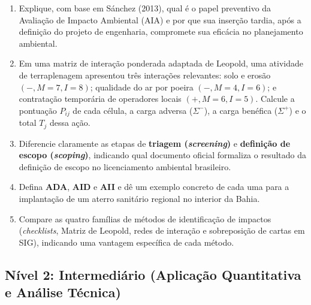 \begin{enumerate}[leftmargin=1.8em, itemsep=4pt]
  \item Explique, com base em Sánchez (2013), qual é o papel preventivo da Avaliação de Impacto Ambiental (AIA) e por que sua inserção tardia, após a definição do projeto de engenharia, compromete sua eficácia no planejamento ambiental.
  \espacoResolucao[2.0cm]

  \item Em uma matriz de interação ponderada adaptada de Leopold, uma atividade de terraplenagem apresentou três interações relevantes: solo e erosão $(-, M=7, I=8)$; qualidade do ar por poeira $(-, M=4, I=6)$; e contratação temporária de operadores locais $(+, M=6, I=5)$. Calcule a pontuação $P_{ij}$ de cada célula, a carga adversa ($\Sigma^{-}$), a carga benéfica ($\Sigma^{+}$) e o total $T_j$ dessa ação.
  \espacoResolucao[2.2cm]

  \item Diferencie claramente as etapas de \textbf{triagem (\textit{screening})} e \textbf{definição de escopo (\textit{scoping})}, indicando qual documento oficial formaliza o resultado da definição de escopo no licenciamento ambiental brasileiro.
  \espacoResolucao[2.0cm]

  \item Defina \textbf{ADA}, \textbf{AID} e \textbf{AII} e dê um exemplo concreto de cada uma para a implantação de um aterro sanitário regional no interior da Bahia.
  \espacoResolucao[2.1cm]

  \item Compare as quatro famílias de métodos de identificação de impactos (\textit{checklists}, Matriz de Leopold, redes de interação e sobreposição de cartas em SIG), indicando uma vantagem específica de cada método.
  \espacoResolucao[2.2cm]
\end{enumerate}

\subsection*{Nível 2: Intermediário (Aplicação Quantitativa e Análise Técnica)}


